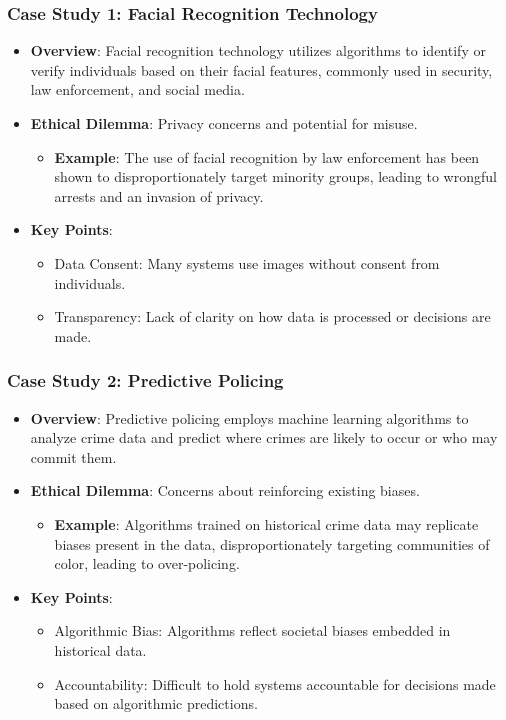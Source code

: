 \documentclass{beamer}
\begin{document}
\begin{frame}[fragile]
    \frametitle{Case Study 1: Facial Recognition Technology}
    \begin{itemize}
        \item \textbf{Overview}: 
            Facial recognition technology utilizes algorithms to identify or verify individuals based on their facial features, commonly used in security, law enforcement, and social media.
        
        \item \textbf{Ethical Dilemma}: 
            Privacy concerns and potential for misuse.
            \begin{itemize}
                \item \textbf{Example}: The use of facial recognition by law enforcement has been shown to disproportionately target minority groups, leading to wrongful arrests and an invasion of privacy.
            \end{itemize}
        
        \item \textbf{Key Points}:
            \begin{itemize}
                \item Data Consent: Many systems use images without consent from individuals.
                \item Transparency: Lack of clarity on how data is processed or decisions are made.
            \end{itemize}
    \end{itemize}
\end{frame}

\begin{frame}[fragile]
    \frametitle{Case Study 2: Predictive Policing}
    \begin{itemize}
        \item \textbf{Overview}: 
            Predictive policing employs machine learning algorithms to analyze crime data and predict where crimes are likely to occur or who may commit them.
        
        \item \textbf{Ethical Dilemma}: 
            Concerns about reinforcing existing biases.
            \begin{itemize}
                \item \textbf{Example}: Algorithms trained on historical crime data may replicate biases present in the data, disproportionately targeting communities of color, leading to over-policing.
            \end{itemize}

        \item \textbf{Key Points}:
            \begin{itemize}
                \item Algorithmic Bias: Algorithms reflect societal biases embedded in historical data.
                \item Accountability: Difficult to hold systems accountable for decisions made based on algorithmic predictions.
            \end{itemize}
    \end{itemize}
\end{frame}
\end{document}
